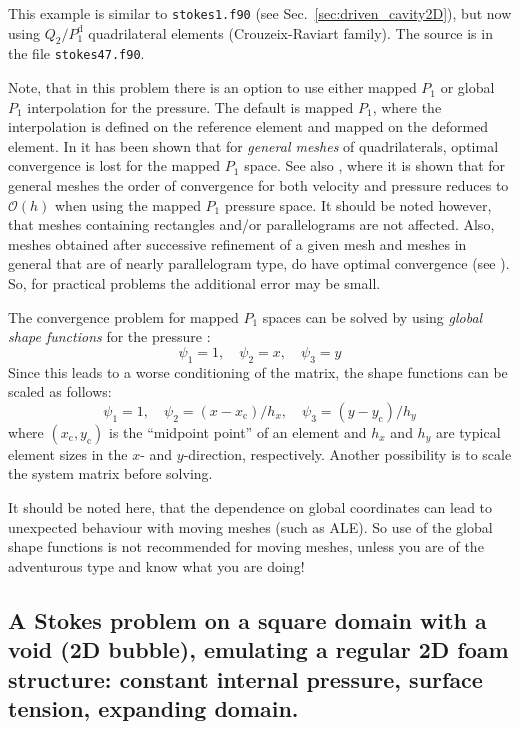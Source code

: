 This example is similar to \texttt{stokes1.f90} (see
Sec.~\ref{sec:driven_cavity2D}), but now using $Q_2/P_1^\mathrm{d}$ quadrilateral elements (Crouzeix-Raviart family).
The source is in the file \texttt{stokes47.f90}.

Note, that in this problem there is an option to use either mapped $P_1$ or
global $P_1$ interpolation for the pressure. The default is mapped $P_1$, where the interpolation is defined on the reference element and mapped on the deformed element. In \cite{Arnold2002} it has been shown that for \emph{general meshes} of quadrilaterals, optimal convergence is lost for the mapped $P_1$ space. 
See also \cite{Boffi2002}, where it is shown that for general meshes
the order of convergence for both velocity and pressure reduces to $\mathcal{O}(h)$ when using the mapped $P_1$ pressure space. It should be noted however, that meshes containing rectangles and/or parallelograms are not affected. Also, meshes obtained after successive refinement of a given mesh and meshes in general that are of nearly parallelogram type, do have optimal convergence (see \cite{Matthies2001}). So, for practical problems the additional error may be small. 

The convergence problem for mapped $P_1$ spaces can be solved by using \emph{global shape functions} for the pressure \cite{Boffi2002}:
\[
    \psi_1 = 1, \quad \psi_2=x, \quad \psi_3=y
\]
Since this leads to a worse conditioning of the matrix, the shape functions can be scaled as follows:
\[
    \psi_1 = 1, \quad \psi_2=(x-x_\text{c})/h_x, \quad \psi_3=(y-y_\text{c})/h_y
\]
where $(x_\text{c},y_\text{c})$ is the ``midpoint point'' of an element and $h_x$ and $h_y$ are typical element sizes in the $x$- and $y$-direction, respectively. Another possibility is to scale the system matrix before solving. 

It should be noted here, that the dependence on global coordinates can lead to unexpected behaviour with moving meshes (such as ALE). So use of the global shape functions is not recommended for moving meshes, unless you are of the adventurous type and know what you are doing!

\subsection{A Stokes problem on a square domain with a void (2D bubble), emulating a regular 2D foam structure:
 constant internal pressure, surface tension, expanding domain.}            
\label{sec:foam1}

